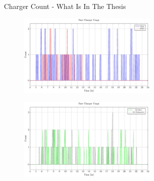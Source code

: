\documentclass[bigger]{beamer}
\begin{document}
\begin{frame}[label={sec:orgb951213}]{Charger Count - What Is In The Thesis}
\begin{figure}[htpb]
\centering
    \includegraphics[width=0.6\textwidth]{img/sa-pap-paper-bad/charger-count-fast-milp-qin}
\end{figure}
\begin{figure}[htpb]
\centering
    \includegraphics[width=0.6\textwidth]{img/sa-pap-paper-bad/charger-count-fast-sa}
\end{figure}
\end{frame}
\end{document}
